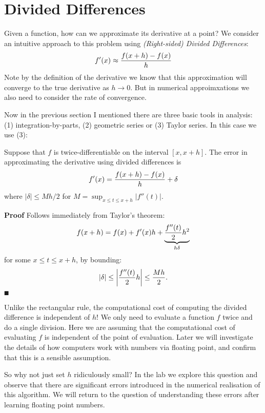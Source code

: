 
\section{Divided Differences}
Given a function, how can we approximate its derivative at a point? We consider an intuitive approach to this problem using \emph{(Right-sided) Divided Differences}: 
\[
f'(x) \ensuremath{\approx} {f(x+h) - f(x) \over h}
\]
Note by the definition of the derivative we know that this approximation will converge to the true derivative as $h \ensuremath{\rightarrow} 0$. But in numerical approimxations we also need to consider the rate of convergence. 

Now in the previous section I mentioned there are three basic tools in analysis:  (1) integration-by-parts, (2) geometric series or (3) Taylor series. In this case we use (3):

\begin{proposition} Suppose that $f$ is twice-differentiable on the interval $[x,x+h]$. The error in approximating the derivative using divided differences is
\[
f'(x) = {f(x+h) - f(x) \over h} + \ensuremath{\delta}
\]
where $|\ensuremath{\delta}| \ensuremath{\leq} Mh/2$ for  $M = \sup_{x \ensuremath{\leq} t \ensuremath{\leq} x+h} |f''(t)|$.

\end{proposition}
\textbf{Proof} Follows immediately from Taylor's theorem:
\[
f(x+h) = f(x) + f'(x) h + \underbrace{{f''(t) \over 2} h^2}_{h \ensuremath{\delta}}
\]
for some $x \ensuremath{\leq} t \ensuremath{\leq} x+h$, by bounding:
\[
|\delta| \leq \left|{{f''(t) \over 2} h}\right| \leq {M  h \over 2}.
\]
\ensuremath{\QED}

Unlike the rectangular rule, the computational cost of computing the divided difference is independent of $h$! We only need to evaluate a function $f$ twice and do a single division. Here we are assuming that the computational cost of evaluating $f$ is independent of the point of evaluation. Later we will investigate the details of how computers work with numbers via floating point,  and confirm that this is a sensible assumption.

So why not just set $h$ ridiculously small? In the lab we explore this question and observe that there are significant errors introduced in the numerical realisation of this algorithm. We will return to the question of understanding these errors after learning floating point numbers. 

